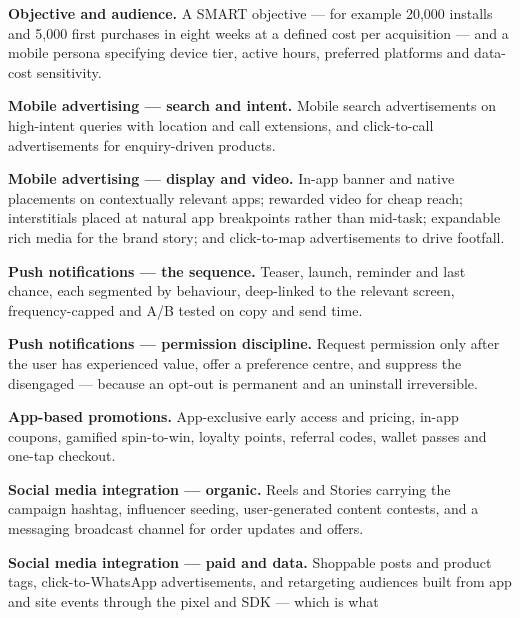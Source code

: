 \begin{qlist}
\begin{apts}
\item \textbf{Objective and audience.} A SMART objective --- for example 20{,}000
      installs and 5{,}000 first purchases in eight weeks at a defined cost per
      acquisition --- and a mobile persona specifying device tier, active hours,
      preferred platforms and data-cost sensitivity.
\item \textbf{Mobile advertising --- search and intent.} Mobile search
      advertisements on high-intent queries with location and call extensions,
      and click-to-call advertisements for enquiry-driven products.
\item \textbf{Mobile advertising --- display and video.} In-app banner and
      native placements on contextually relevant apps; rewarded video for cheap
      reach; interstitials placed at natural app breakpoints rather than
      mid-task; expandable rich media for the brand story; and click-to-map
      advertisements to drive footfall.
\item \textbf{Push notifications --- the sequence.} Teaser, launch, reminder and
      last chance, each segmented by behaviour, deep-linked to the relevant
      screen, frequency-capped and A/B tested on copy and send time.
\item \textbf{Push notifications --- permission discipline.} Request permission
      only after the user has experienced value, offer a preference centre, and
      suppress the disengaged --- because an opt-out is permanent and an
      uninstall irreversible.
\item \textbf{App-based promotions.} App-exclusive early access and pricing,
      in-app coupons, gamified spin-to-win, loyalty points, referral codes,
      wallet passes and one-tap checkout.
\item \textbf{Social media integration --- organic.} Reels and Stories carrying
      the campaign hashtag, influencer seeding, user-generated content contests,
      and a messaging broadcast channel for order updates and offers.
\item \textbf{Social media integration --- paid and data.} Shoppable posts and
      product tags, click-to-WhatsApp advertisements, and retargeting audiences
      built from app and site events through the pixel and SDK --- which is what

\end{apts}
\end{qlist}
